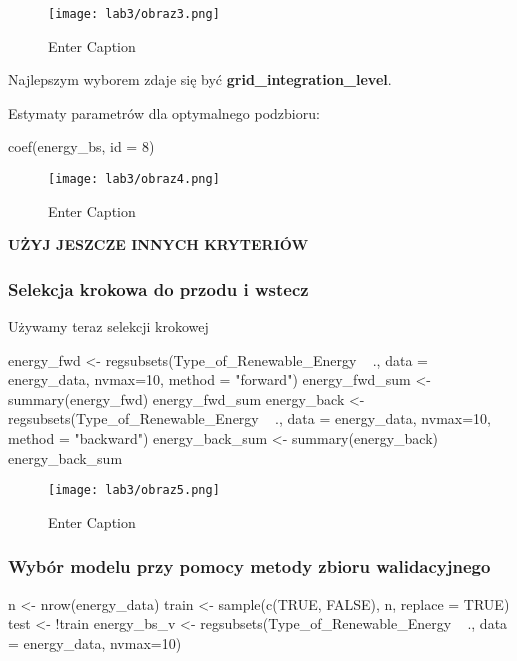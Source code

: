 \begin{figure}[H]
    \centering
    \texttt{[image: lab3/obraz3.png]}
    \caption{Enter Caption}
    \label{fig:enter-label}
\end{figure}

Najlepszym wyborem zdaje się być \textbf{grid\_integration\_level}.

Estymaty parametrów dla optymalnego podzbioru:

\begin{Rcode}
coef(energy_bs, id = 8)
\end{Rcode}

\begin{figure}[H]
    \centering
    \texttt{[image: lab3/obraz4.png]}
    \caption{Enter Caption}
    \label{fig:enter-label}
\end{figure}

\textbf{UŻYJ JESZCZE INNYCH KRYTERIÓW}

\subsubsection{Selekcja krokowa do przodu i wstecz}
Używamy teraz selekcji krokowej

\begin{Rcode}
energy_fwd <- regsubsets(Type_of_Renewable_Energy ~ ., data = energy_data, nvmax=10, 
                          method = "forward")
energy_fwd_sum <- summary(energy_fwd)
energy_fwd_sum
energy_back <- regsubsets(Type_of_Renewable_Energy ~ ., data = energy_data, nvmax=10, 
                          method = "backward")
energy_back_sum <- summary(energy_back)
energy_back_sum
\end{Rcode}

\begin{figure}[H]
    \centering
    \texttt{[image: lab3/obraz5.png]}
    \caption{Enter Caption}
    \label{fig:enter-label}
\end{figure}

\subsubsection{Wybór modelu przy pomocy metody zbioru walidacyjnego}

\begin{Rcode}
n <- nrow(energy_data)
train <- sample(c(TRUE, FALSE), n, replace = TRUE)
test <- !train
energy_bs_v <- regsubsets(Type_of_Renewable_Energy ~ ., data = energy_data, nvmax=10)
\end{Rcode}


